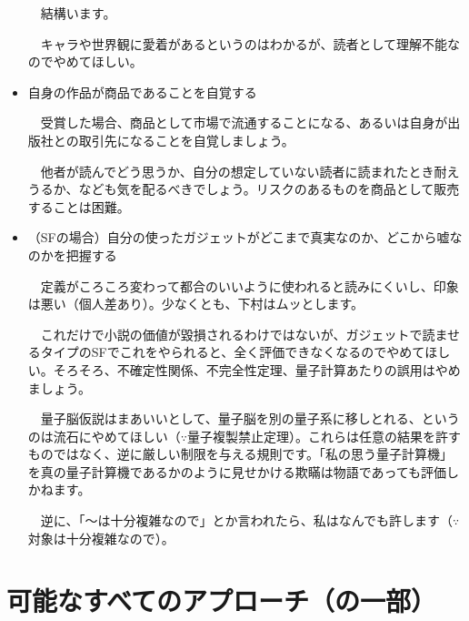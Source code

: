 \documentclass[10pt, a5paper, twoside]{jsarticle}
\theoremstyle{definition}
\begin{document}
\begin{itemize}
				\vspace{1mm}

				　結構います。

				　キャラや世界観に愛着があるというのはわかるが、読者として理解不能なのでやめてほしい。

				\vspace{2mm}

				\item 自身の作品が商品であることを自覚する

				\vspace{1mm}

				　受賞した場合、商品として市場で流通することになる、あるいは自身が出版社との取引先になることを自覚しましょう。

				　他者が読んでどう思うか、自分の想定していない読者に読まれたとき耐えうるか、なども気を配るべきでしょう。リスクのあるものを商品として販売することは困難。

				\vspace{2mm}

				\item （SFの場合）自分の使ったガジェットがどこまで真実なのか、どこから嘘なのかを把握する

				\vspace{1mm}

				　定義がころころ変わって都合のいいように使われると読みにくいし、印象は悪い（個人差あり）。少なくとも、下村はムッとします。

				　これだけで小説の価値が毀損されるわけではないが、ガジェットで読ませるタイプのSFでこれをやられると、全く評価できなくなるのでやめてほしい。そろそろ、不確定性関係、不完全性定理、量子計算あたりの誤用はやめましょう。

				　量子脳仮説はまあいいとして、量子脳を別の量子系に移しとれる、というのは流石にやめてほしい（$\because$量子複製禁止定理）。これらは任意の結果を許すものではなく、逆に厳しい制限を与える規則です。「私の思う量子計算機」を真の量子計算機であるかのように見せかける欺瞞は物語であっても評価しかねます。

				　逆に、「〜は十分複雑なので」とか言われたら、私はなんでも許します（$\because$対象は十分複雑なので）。

			\end{itemize}

	\section{可能なすべてのアプローチ（の一部）}
\end{document}
